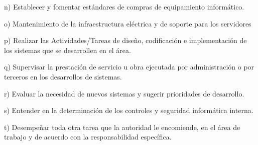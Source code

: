 \begin{displayquote}
n) Establecer y fomentar estándares de compras de equipamiento informático.

o) Mantenimiento de la infraestructura eléctrica y de soporte para los servidores

p) Realizar las Actividades/Tareas de diseño, codificación e implementación de los sistemas que se desarrollen en el área.

q) Supervisar la prestación de servicio u obra ejecutada por administración o por terceros en los desarrollos de sistemas.

r) Evaluar la necesidad de nuevos sistemas y sugerir prioridades de desarrollo.

s) Entender en la determinación de los controles y seguridad informática interna.

t) Desempeñar toda otra tarea que la autoridad le encomiende, en el área de trabajo y de acuerdo con la responsabilidad específica.
\hfill\parencite{CSOrd17}
\end{displayquote}

